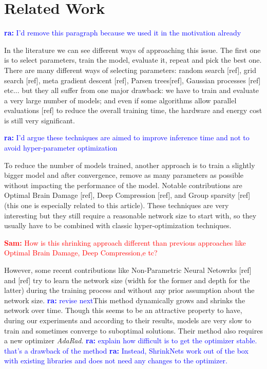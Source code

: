 \documentclass[sigconf]{acmart}
\newcommand{\srm}[1]{\textcolor{red}{{\bf Sam:} #1}}
\newcommand{\ra}[1]{\textcolor{blue}{{\bf ra:} #1}}
\begin{document}
\section{Related Work}

\ra{I'd remove this paragraph because we used it in the motivation already}
\par In the literature we can see different ways of approaching this issue. The
first one is to select parameters, train the model, evaluate it, repeat and pick
the best one. There are many different ways of selecting parameters: random
search [ref], grid search [ref], meta gradient descent [ref], Parsen trees[ref],
Gaussian processes [ref] etc... but they all suffer from one major drawback: we
have to train and evaluate a very large number of models; and even if some
algorithms allow parallel evaluations [ref] to reduce the overall training time,
the hardware and energy cost is still very significant.  

\ra{I'd argue these techniques are aimed to improve inference time and not to
avoid hyper-parameter optimization}
\par To reduce the number of models trained, another approach is to train a
slightly bigger model and after convergence, remove as many parameters as
possible without impacting the performance of the model. Notable contributions
are Optimal Brain Damage [ref], Deep Compression [ref], and Group sparsity [ref]
(this one is especially related to this article). These techniques are very
interesting but they still require a reasonable network size to start with, so
they usually have to be combined with classic hyper-optimization techniques.  

\srm{How is this shrinking
approach different than previous approaches like Optimal Brain Damage, Deep
Compression,e tc?} 

\par However, some recent contributions like Non-Parametric Neural Netowrks
[ref] and [ref] try to learn the network size (width for the former and depth
for the latter) during the training process and without any prior assumption
about the network size. \ra{revise next}This method dynamically grows and shrinks the network
over time. Though this seems to be an attractive property to have, during our
experiments and according to their results, models are very slow to train and
sometimes converge to suboptimal solutions. Their method also requires a new
optimizer \textit{AdaRad}. \ra{explain how difficult is to get the optimizer
stable. that's a drawback of the method} \ra{Instead, ShrinkNets work out of the
box with existing libraries and does not need any changes to the optimizer.}
\end{document}

